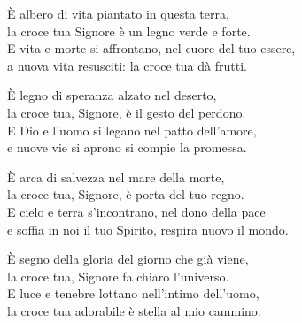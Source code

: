 
\strofa È albero di vita piantato in questa terra,\\
la croce tua Signore è un legno verde e forte.\\
E vita e morte si affrontano, nel cuore del tuo essere,\\
a nuova vita resusciti: la croce tua dà frutti.

\spazio

\strofa È legno di speranza alzato nel deserto,\\
la croce tua, Signore, è il gesto del perdono.\\
E Dio e l'uomo si legano nel patto dell'amore,\\
e nuove vie si aprono si compie la promessa.

\spazio

\strofa È arca di salvezza nel mare della morte,\\
la croce tua, Signore, è porta del tuo regno.\\
E cielo e terra s'incontrano, nel dono della pace\\
e soffia in noi il tuo Spirito, respira nuovo il mondo.

\spazio

\strofa È segno della gloria del giorno che già viene,\\
la croce tua, Signore fa chiaro l'universo.\\
E luce e tenebre lottano nell'intimo dell'uomo,\\
la croce tua adorabile è stella al mio cammino.
